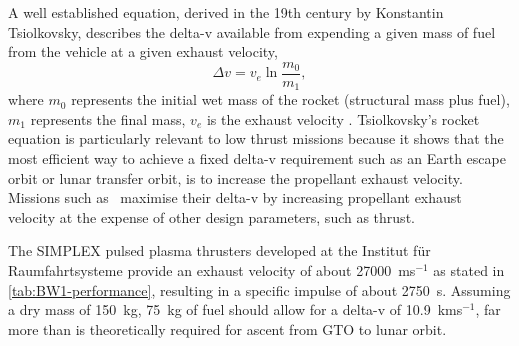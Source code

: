 A well established equation, derived in the 19th century by Konstantin Tsiolkovsky, describes the delta-v available from expending a given mass of fuel from the vehicle at a given exhaust velocity,
\begin{equation}\label{eq:Tsiolkovsky}
\Delta v=v_{e}\ln\frac{m_{0}}{m_{1}},
\end{equation}
where $m_{0}$ represents the initial wet mass of the rocket (structural mass plus fuel), $m_{1}$ represents the final mass, $v_{e}$ is the exhaust velocity \parencite{Tsiolkovsky1903,Chobotov2002}. Tsiolkovsky's rocket equation is particularly relevant to low thrust missions because it shows that the most efficient way to achieve a fixed delta-v requirement such as an Earth escape orbit or lunar transfer orbit, is to increase the propellant exhaust velocity. Missions such as \BW\ maximise their delta-v by increasing propellant exhaust velocity at the expense of other design parameters, such as thrust.

The SIMPLEX pulsed plasma thrusters developed at the Institut f\"{u}r Raumfahrtsysteme \parencite{Nawaz2008} provide an exhaust velocity of about 27000~ms$^{-1}$ as stated in \autoref{tab:BW1-performance}, resulting in a specific impulse of about 2750~s. Assuming a dry mass of 150~kg, 75~kg of fuel should allow for a delta-v of 10.9~kms$^{-1}$, far more than is theoretically required for ascent from GTO to lunar orbit.




